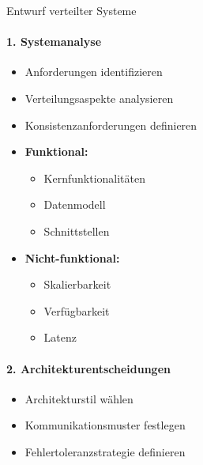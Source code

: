 \begin{KR}{Entwurf verteilter Systeme}
\paragraph{1. Systemanalyse}
\begin{itemize}
    \item Anforderungen identifizieren
    \item Verteilungsaspekte analysieren
    \item Konsistenzanforderungen definieren
\end{itemize}

    \begin{minipage}[t]{0.5\textwidth}
        \begin{itemize}
            \item \textbf{Funktional:}
        \begin{itemize}
            \item Kernfunktionalitäten
            \item Datenmodell
            \item Schnittstellen
        \end{itemize}
    \end{itemize}
    \end{minipage}
    \begin{minipage}[t]{0.5\textwidth}
        \begin{itemize}
            \item \textbf{Nicht-funktional:}
        \begin{itemize}
            \item Skalierbarkeit
            \item Verfügbarkeit
            \item Latenz
        \end{itemize}
    \end{itemize}
    \end{minipage}

\paragraph{2. Architekturentscheidungen}
\begin{itemize}
    \item Architekturstil wählen
    \item Kommunikationsmuster festlegen
    \item Fehlertoleranzstrategie definieren
\end{itemize}


\end{KR}
